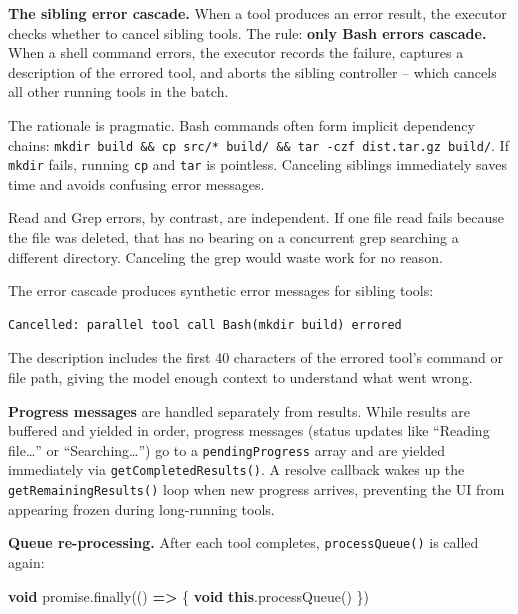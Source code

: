 \documentclass[
  english,
  11pt,
  letterpaper,
]{book}
\newenvironment{Shaded}{\begin{snugshade}}{\end{snugshade}}
\newcommand{\FunctionTok}[1]{\textcolor[rgb]{0.28,0.35,0.67}{#1}}
\newcommand{\KeywordTok}[1]{\textcolor[rgb]{0.00,0.23,0.31}{\textbf{#1}}}
\newcommand{\NormalTok}[1]{\textcolor[rgb]{0.00,0.23,0.31}{#1}}
\newcommand{\OperatorTok}[1]{\textcolor[rgb]{0.37,0.37,0.37}{#1}}
\begin{document}
\textbf{The sibling error cascade.} When a tool produces an error
result, the executor checks whether to cancel sibling tools. The rule:
\textbf{only Bash errors cascade.} When a shell command errors, the
executor records the failure, captures a description of the errored
tool, and aborts the sibling controller -- which cancels all other
running tools in the batch.

The rationale is pragmatic. Bash commands often form implicit dependency
chains:
\texttt{mkdir\ build\ \&\&\ cp\ src/*\ build/\ \&\&\ tar\ -czf\ dist.tar.gz\ build/}.
If \texttt{mkdir} fails, running \texttt{cp} and \texttt{tar} is
pointless. Canceling siblings immediately saves time and avoids
confusing error messages.

Read and Grep errors, by contrast, are independent. If one file read
fails because the file was deleted, that has no bearing on a concurrent
grep searching a different directory. Canceling the grep would waste
work for no reason.

The error cascade produces synthetic error messages for sibling tools:

\begin{verbatim}
Cancelled: parallel tool call Bash(mkdir build) errored
\end{verbatim}

The description includes the first 40 characters of the errored tool's
command or file path, giving the model enough context to understand what
went wrong.

\textbf{Progress messages} are handled separately from results. While
results are buffered and yielded in order, progress messages (status
updates like ``Reading file\ldots{}'' or ``Searching\ldots{}'') go to a
\texttt{pendingProgress} array and are yielded immediately via
\texttt{getCompletedResults()}. A resolve callback wakes up the
\texttt{getRemainingResults()} loop when new progress arrives,
preventing the UI from appearing frozen during long-running tools.

\textbf{Queue re-processing.} After each tool completes,
\texttt{processQueue()} is called again:

\begin{Shaded}
\begin{Highlighting}[]
\KeywordTok{void}\NormalTok{ promise}\OperatorTok{.}\FunctionTok{finally}\NormalTok{(() }\KeywordTok{=\textgreater{}}\NormalTok{ \{}
  \KeywordTok{void} \KeywordTok{this}\OperatorTok{.}\FunctionTok{processQueue}\NormalTok{()}
\NormalTok{\})}
\end{Highlighting}
\end{Shaded}
\end{document}
